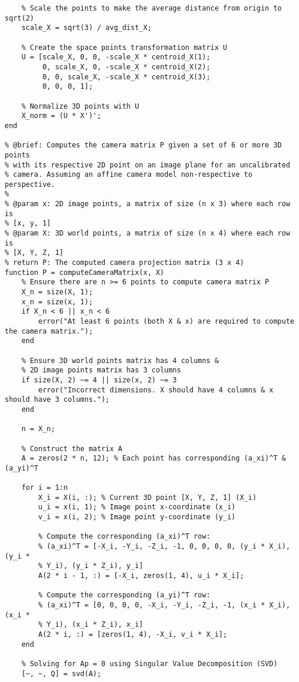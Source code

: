\documentclass[12pt]{article}
\begin{document}
\begin{lstlisting}
    % Scale the points to make the average distance from origin to sqrt(2)
    scale_X = sqrt(3) / avg_dist_X;
    
    % Create the space points transformation matrix U
    U = [scale_X, 0, 0, -scale_X * centroid_X(1);
         0, scale_X, 0, -scale_X * centroid_X(2);
         0, 0, scale_X, -scale_X * centroid_X(3);
         0, 0, 0, 1];

    % Normalize 3D points with U
    X_norm = (U * X')';
end

% @brief: Computes the camera matrix P given a set of 6 or more 3D points
% with its respective 2D point on an image plane for an uncalibrated
% camera. Assuming an affine camera model non-respective to perspective.
% 
% @param x: 2D image points, a matrix of size (n x 3) where each row is
% [x, y, 1]
% @param X: 3D world points, a matrix of size (n x 4) where each row is
% [X, Y, Z, 1]
% return P: The computed camera projection matrix (3 x 4)
function P = computeCameraMatrix(x, X)
    % Ensure there are n >= 6 points to compute camera matrix P
    X_n = size(X, 1);
    x_n = size(x, 1);
    if X_n < 6 || x_n < 6
        error("At least 6 points (both X & x) are required to compute the camera matrix.");
    end

    % Ensure 3D world points matrix has 4 columns &
    % 2D image points matrix has 3 columns
    if size(X, 2) ~= 4 || size(x, 2) ~= 3
        error("Incorrect dimensions. X should have 4 columns & x should have 3 columns.");
    end

    n = X_n;

    % Construct the matrix A
    A = zeros(2 * n, 12); % Each point has corresponding (a_xi)^T & (a_yi)^T

    for i = 1:n
        X_i = X(i, :); % Current 3D point [X, Y, Z, 1] (X_i)
        u_i = x(i, 1); % Image point x-coordinate (x_i)
        v_i = x(i, 2); % Image point y-coordinate (y_i)
        
        % Compute the corresponding (a_xi)^T row:
        % (a_xi)^T = [-X_i, -Y_i, -Z_i, -1, 0, 0, 0, 0, (y_i * X_i), (y_i *
        % Y_i), (y_i * Z_i), y_i]
        A(2 * i - 1, :) = [-X_i, zeros(1, 4), u_i * X_i];
        
        % Compute the corresponding (a_yi)^T row:
        % (a_xi)^T = [0, 0, 0, 0, -X_i, -Y_i, -Z_i, -1, (x_i * X_i), (x_i *
        % Y_i), (x_i * Z_i), x_i]
        A(2 * i, :) = [zeros(1, 4), -X_i, v_i * X_i];
    end
    
    % Solving for Ap = 0 using Singular Value Decomposition (SVD)
    [~, ~, Q] = svd(A);
 

\end{lstlisting}
\end{document}
